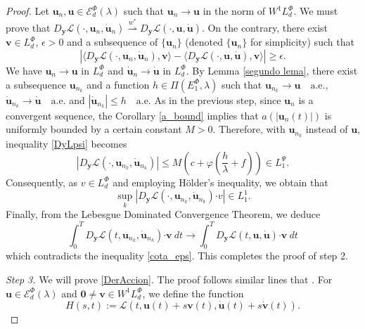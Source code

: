 \documentclass[twoside]{article}
\theoremstyle{remark}
\newcommand{\lphi}{L^{\Phi}}
\newcommand{\lpsi}{L^{\Psi}}
\newcommand{\ephi}{E^{\Phi}}
\newcommand{\wphi}{W^{1}\lphi}
\newcommand{\domi}{\mathcal{E}^{\Phi}_d(\lambda)}
\renewcommand{\b}[1]{\boldsymbol{#1}}
\newcommand{\ccdot}{\b{\cdot}}
\renewcommand{\leq}{\leqslant}
\begin{document}
\begin{proof}
Let $\b{u}_n,\b{u}\in \domi$ such that $\b{u}_n\to \b{u}$ in the norm of $\wphi_d$. 
We must prove that  $D_{\b{y}}\mathcal{L}(\cdot,\b{u}_n,\dot{\b{u}}_n)\overset{w^*}{\rightharpoonup} D_{\b{y}}\mathcal{L}(\cdot,\b{u},\b{\dot{u}})$. On the contrary, there exist $\b{v}\in\lphi_d$, $\epsilon>0$ and a subsequence of $\{\b{u}_n\}$ (denoted  $\{\b{u}_n\}$ for simplicity)  such that
\begin{equation}\label{cota_eps}
 \left| \langle D_{\b{y}}\mathcal{L}(\cdot,\b{u}_n,\b{\dot{u}}_n),\b{v} \rangle - \langle  D_{\b{y}}\mathcal{L}(\cdot,\b{u},\b{\dot{u}}),\b{v} \rangle\right|\geq \epsilon.
\end{equation}
We have $\b{u}_n\rightarrow \b{u}$ in $\lphi_d$ and
$\b{\dot{u}}_n\rightarrow \b{\dot{u}}$ in $\lphi_d$. By Lemma \ref{segundo lema}, there exist a subsequence $\b{u}_{n_k}$ and a function $h\in \Pi(\ephi_1,\lambda)$ such that $\b{u}_{n_k}\rightarrow \b{u} \quad\text{a.e.}$, $\b{\dot{u}}_{n_k}\rightarrow \b{\dot{u}} \quad\text{a.e.}$ and $|\b{\dot{u}}_{n_k}|\leq h\quad\text{a.e.}$ 
As in the previous step, since $\b{u}_n$ is a convergent sequence, the Corollary \ref{a_bound} implies that $a(|\b{u}_n(t)|)$ is uniformly bounded by a certain constant $M>0$. 
Therefore,  with $\b{u}_{n_k}$ instead of $\b{u}$, inequality  \eqref{DyLpsi} becomes 
\begin{equation}\label{Dy-suc}
  \left | D_{\b{y}}\mathcal{L}(\cdot,\b{u}_{n_k},\b{\dot{u}}_{n_k})  \right| 
	\leq M\left(c+\varphi\left(\frac{h}{\lambda}+f\right)\right)\in \lpsi_1.
\end{equation}
Consequently, as $v \in \lphi_d$ and employing H\"older's inequality, we obtain that
\[\sup_k|D_{\b{y}}\mathcal{L}(\cdot,\b{u}_{n_k},\b{\dot{u}}_{n_k})\ccdot v| \in L^1_1.\]
  Finally, from the Lebesgue Dominated Convergence Theorem, we deduce
\begin{equation}\label{conv_debil}\int_0^T  D_{\b{y}}\mathcal{L}(t,\b{u}_{n_k},\b{\dot{u}}_{n_k})\ccdot\b{ v} \ dt \to \int_0^T D_{\b{y}}\mathcal{L}(t,\b{u},\b{\dot{u}})\ccdot\b{ v}\ dt \end{equation}
which contradicts the inequality \eqref{cota_eps}. This completes the proof of step 2.

\emph{Step 3.} We will prove \eqref{DerAccion}. The proof follows similar lines that \cite[Thm. 1.4]{mawhin2010critical}. For $\b{u}\in \domi$ and $\b{0}\neq\b{v}\in\wphi_d$, we define the function
\[H(s,t):=\mathcal{L}(t,\b{u}(t)+s\b{v}(t),\b{\dot{u}}(t)+s\b{\dot{v}}(t)).\]


\end{proof}
\end{document}
